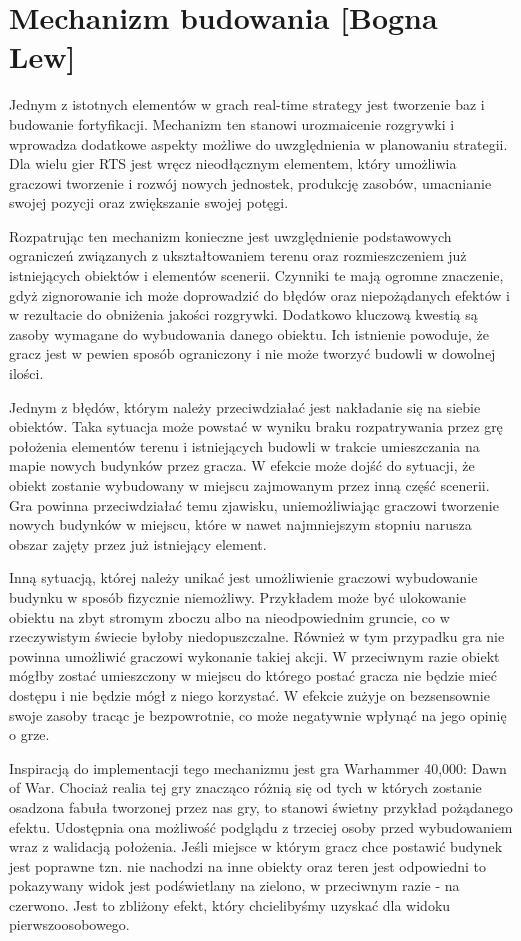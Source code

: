 \section{Mechanizm budowania [Bogna Lew]}\label{chap:build}
Jednym z istotnych elementów w grach real-time strategy jest tworzenie baz i budowanie fortyfikacji. Mechanizm ten
stanowi urozmaicenie rozgrywki i wprowadza dodatkowe aspekty możliwe do uwzględnienia w planowaniu strategii. Dla wielu
gier RTS jest wręcz nieodłącznym elementem, który umożliwia graczowi tworzenie i rozwój nowych jednostek, produkcję
zasobów, umacnianie swojej pozycji oraz zwiększanie swojej potęgi.

Rozpatrując ten mechanizm konieczne jest uwzględnienie podstawowych ograniczeń związanych z ukształtowaniem terenu oraz
rozmieszczeniem już istniejących obiektów i elementów scenerii. Czynniki te mają ogromne znaczenie, gdyż zignorowanie
ich może doprowadzić do błędów oraz niepożądanych efektów i w rezultacie do obniżenia jakości rozgrywki. Dodatkowo
kluczową kwestią są zasoby wymagane do wybudowania danego obiektu. Ich istnienie powoduje, że gracz jest w pewien sposób
ograniczony i nie może tworzyć budowli w dowolnej ilości.

Jednym z błędów, którym należy przeciwdziałać jest nakładanie się na siebie obiektów. Taka sytuacja może powstać w
wyniku braku rozpatrywania przez grę położenia elementów terenu i istniejących budowli w trakcie umieszczania na mapie
nowych budynków przez gracza. W efekcie może dojść do sytuacji, że obiekt zostanie wybudowany w miejscu zajmowanym przez
inną część scenerii. Gra powinna przeciwdziałać temu zjawisku, uniemożliwiając graczowi tworzenie nowych budynków w
miejscu, które w nawet najmniejszym stopniu narusza obszar zajęty przez już istniejący element.

Inną sytuacją, której należy unikać jest umożliwienie graczowi wybudowanie budynku w sposób fizycznie niemożliwy.
Przykładem może być ulokowanie obiektu na zbyt stromym zboczu albo na nieodpowiednim gruncie, co w rzeczywistym świecie
byłoby niedopuszczalne. Również w tym przypadku gra nie powinna umożliwić graczowi wykonanie takiej akcji. W przeciwnym
razie obiekt mógłby zostać umieszczony w miejscu do którego postać gracza nie będzie mieć dostępu i nie będzie mógł z
niego korzystać. W efekcie zużyje on bezsensownie swoje zasoby tracąc je bezpowrotnie, co może negatywnie wpłynąć na
jego opinię o grze.

Inspiracją do implementacji tego mechanizmu jest gra Warhammer 40,000: Dawn of War. Chociaż realia tej gry znacząco
różnią się od tych w których zostanie osadzona fabuła tworzonej przez nas gry, to stanowi świetny przykład pożądanego
efektu. Udostępnia ona możliwość podglądu z trzeciej osoby przed wybudowaniem wraz z walidacją położenia. Jeśli miejsce
w którym gracz chce postawić budynek jest poprawne tzn. nie nachodzi na inne obiekty oraz teren jest odpowiedni to
pokazywany widok jest podświetlany na zielono, w przeciwnym razie - na czerwono. Jest to zbliżony efekt, który
chcielibyśmy uzyskać dla widoku pierwszoosobowego.

